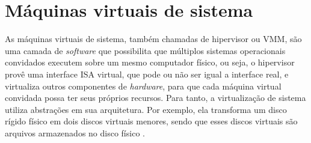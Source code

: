 
\section{Máquinas virtuais de sistema}
\label{section:virtsistema}

As máquinas virtuais de sistema, também chamadas de hipervisor ou \ac{VMM}, são uma camada de \textit{software} que possibilita
que múltiplos sistemas operacionais convidados executem sobre um mesmo computador físico, ou seja, o hipervisor provê uma interface
\ac{ISA} virtual, que pode ou não ser igual a interface real, e virtualiza outros componentes de \textit{hardware}, para que cada máquina
virtual convidada possa ter seus próprios recursos. Para tanto, a virtualização de sistema utiliza abstrações em sua arquitetura. 
Por exemplo, ela transforma um disco rígido físico em dois discos virtuais menores, sendo que esses discos virtuais são arquivos armazenados no 
disco físico \cite{smithenair2005}.

